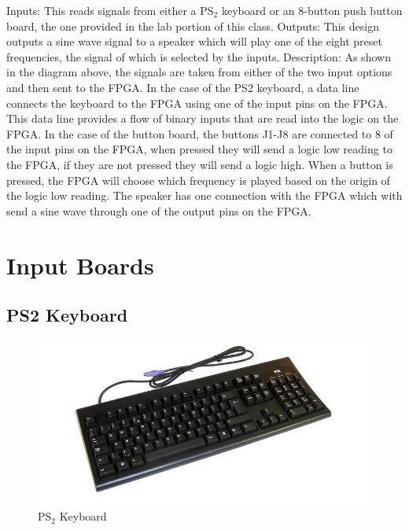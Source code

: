 \documentclass[a4paper]{article}
\begin{document}
Inputs: This reads signals from either a PS${_2}$ keyboard or an 8-button push button board, the one provided in the lab portion of this class. \newline\newline\newline
Outputs: This design outputs a sine wave signal to a speaker which will play one of the eight preset frequencies, the signal of which is selected by the inputs. 
\newline\newline
Description: As shown in the diagram above, the signals are taken from either of the two input options and then sent to the FPGA. In the case of the PS2 keyboard, a data line connects the keyboard to the FPGA using one of the input pins on the FPGA. This data line provides a flow of binary inputs that are read into the logic on the FPGA. In the case of the button board, the buttons J1-J8 are connected to 8 of the input pins on the FPGA, when pressed they will send a logic low reading to the FPGA, if they are not pressed they will send a logic high. When a button is pressed, the FPGA will choose which frequency is played based on the origin of the logic low reading. The speaker has one connection with the FPGA which with send a sine wave through one of the output pins on the FPGA. 


\section{Input Boards}

\subsection{PS2 Keyboard}

\begin{figure}[h]
    \includegraphics[width=6 in]{Images/ps2keyboard.png}
    \caption{PS${_2}$ Keyboard}
    \label{fig:2}
\end{figure}
\end{document}
